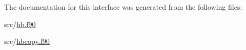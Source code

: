 The documentation for this interface was generated from the following files\+:\begin{DoxyCompactItemize}
\item 
src/\hyperlink{hb_8f90}{hb.\+f90}\item 
src/\hyperlink{hbcopy_8f90}{hbcopy.\+f90}\end{DoxyCompactItemize}
